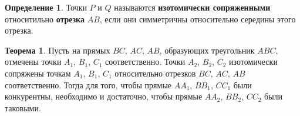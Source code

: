 \documentclass[14pt]{extarticle}
\theoremstyle{definition}
\newtheorem*{definition}{Определение}
\theoremstyle{theorem}
\newtheorem*{theorem}{Теорема}
\begin{document}
\begin{definition}
Точки \(P\) и \(Q\) называются \textbf{изотомически сопряженными}
относитильно \textbf{отрезка} \(AB\), если они %
симметричны относительно середины этого отрезка.\\
\end{definition}

\begin{theorem}
Пусть на прямых \(BC\), \(AC\), \(AB\), образующих треугольник \(ABC\),
отмечены точки \(A_1\), \(B_1\), \(C_1\) соответственно. Точки
\(A_2\), \(B_2\), \(C_2\) изотомически сопряжены точкам \(A_1\), \(B_1\), 
\(C_1\) относительно отрезков \(BC\), \(AC\), \(AB\) соответственно.
Тогда для того, чтобы прямые \(AA_1\), \(BB_1\), \(CC_1\) были конкурентны,
необходимо и достаточно, чтобы прямые \(AA_2\), \(BB_2\), \(CC_2\) были таковыми.
\end{theorem}

\begin{figure}
    \vspace{-0.7cm}
	\vspace{-1cm}
\end{figure}
\end{document}
